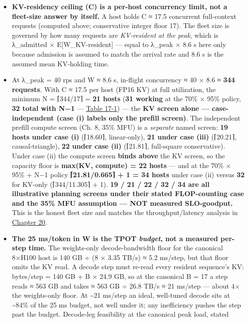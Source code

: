 \begin{itemize}
\tightlist
\item
  \textbf{KV-residency ceiling (C) is a per-host concurrency limit, not
  a fleet-size answer by itself.} A host holds C ≈ 17.5 concurrent
  full-context requests (computed above; conservative integer floor 17).
  The fleet size is governed by how many requests are \emph{KV-resident
  at the peak}, which is λ\_admitted × E{[}W\_KV-resident{]} --- equal
  to λ\_peak × 8.6 s here only because admission is assumed to match the
  arrival rate and 8.6 s is the assumed mean KV-holding time.
\item
  At λ\_peak = 40 rps and W ≈ 8.6 s, in-flight concurrency ≈ 40 × 8.6 ≈
  \textbf{344 requests}. With C ≈ 17.5 per host (FP16 KV) at full
  utilization, the minimum N = ⌈344/17⌉ = \textbf{21 hosts} (\textbf{31
  working} at the 70\% × 95\% policy, \textbf{32 total with N−1} ---
  \hyperref[tab:17.1]{Table 17-1}) --- the \textbf{KV screen alone --- case-independent (case
  (i) labels only the prefill screen)}. The independent prefill compute
  screen (Ch. 8, 35\% MFU) is a \emph{separate} named screen: \textbf{19
  hosts under case (i)} (⌈18.60⌉, linear-only), \textbf{21 under case
  (iii)} (⌈20.21⌉, causal-triangle), \textbf{22 under case (ii)}
  (⌈21.81⌉, full-square conservative). Under case (ii) the compute
  screen \textbf{binds above} the KV screen, so the capacity floor is
  \textbf{max(KV, compute) = 22 hosts} --- and at the 70\% × 95\% + N−1
  policy \textbf{⌈21.81/0.665⌉ + 1 = 34 hosts} under case (ii) versus
  \textbf{32} for KV-only (⌈344/11.305⌉ + 1). \textbf{19 / 21 / 22 / 32
  / 34 are all illustrative planning screens under their stated
  FLOP-counting case and the 35\% MFU assumption --- NOT measured
  SLO-goodput.} This is the honest fleet size and matches the
  throughput/latency analysis in \hyperref[chap:20]{Chapter 20}.
\item
  \textbf{The 25 ms/token in W is the TPOT \emph{budget}, not a measured
  per-step time.} The weights-only decode-bandwidth floor for the
  canonical 8×H100 host is 140 GB ÷ (8 × 3.35 TB/s) ≈ 5.2 ms/step, but
  that floor omits the KV read. A decode step must re-read every
  resident sequence's KV: bytes/step = 140 GB + B × 24.9 GB, so at the
  canonical B = 17 a step reads ≈ 563 GB and takes ≈ 563 GB ÷ 26.8 TB/s
  ≈ 21 ms/step --- about 4× the weights-only floor. At \textasciitilde21
  ms/step an ideal, well-tuned decode sits at \textasciitilde84\% of the
  25 ms budget, not well under it; any inefficiency pushes the step past
  the budget. Decode-leg feasibility at the canonical peak load, stated

\end{itemize}
